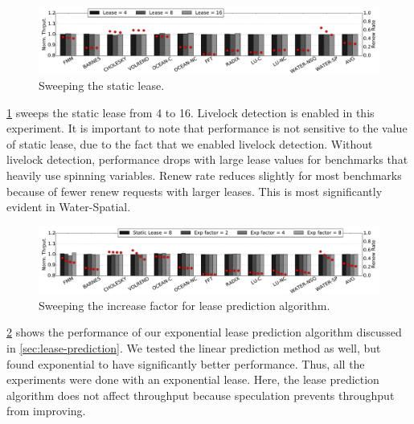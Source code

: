 \documentclass[12pt]{article}
\begin{document}
\begin{figure}
	\centering
	\includegraphics[width=0.95\columnwidth]{figs/static.pdf}
	\caption{ Sweeping the static lease.  }
	\label{fig:static}
\end{figure}


\cref{fig:static} sweeps the static lease from 4 to 16. Livelock 
detection is enabled in this experiment. It is important to note that 
performance is not sensitive to the value of static lease, due to the 
fact that we enabled livelock detection. Without livelock detection, 
performance drops with large lease values for benchmarks that heavily 
use spinning variables. Renew rate reduces slightly for most 
benchmarks because of fewer renew requests with larger leases. This is 
most significantly evident in Water-Spatial.

\begin{figure}
	\centering
	\includegraphics[width=0.95\columnwidth]{figs/exp.pdf}
	\caption{ Sweeping the increase factor for lease prediction 
	algorithm.}
	\label{fig:exp}
\end{figure}

\cref{fig:exp} shows the performance of our exponential lease 
prediction algorithm discussed in \cref{sec:lease-prediction}. We tested the linear prediction method as well, but found exponential to have significantly better performance. Thus, all the experiments were done with an exponential lease.
Here, the lease prediction algorithm does not affect throughput 
because speculation prevents throughput from improving.
\end{document}
